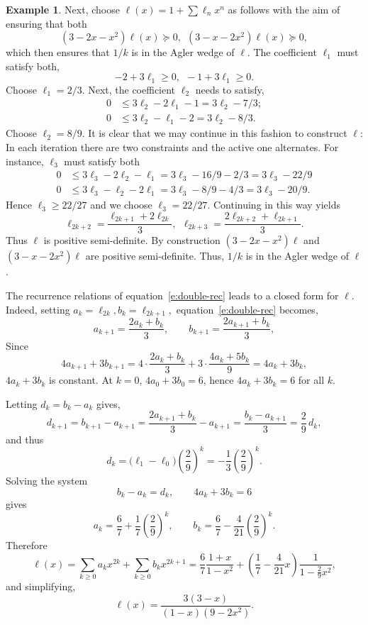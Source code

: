 \documentclass[a4paper,reqno,index]{amsart}
\numberwithin{equation}{section}
\theoremstyle{definition}
\newtheorem{example}[theorem]{Example}
\begin{document}
\begin{example}
 
Next, choose $\ell(x)= 1 +\sum \ell_n x^n$ as 
 follows with the aim of ensuring that both
\[
  (3-2x-x^2)\ell(x)\succeq 0, \  \ (3-x-2x^2)\ell(x) \succeq 0,
\]
 which then ensures that $1/k$ is in the Agler wedge of $\ell.$
The coefficient $\ell_1$ must satisfy both,
\[
 -2 + 3\ell_1 \ge0, \ \ -1 +3\ell_1 \ge0.
\]
Choose $\ell_1 = 2/3.$  Next, the coefficient $\ell_2$ needs to satisfy,
\[
\begin{split}
 0 & \le 3\ell_2 - 2\ell_1 -1 = 3\ell_2 - 7/3;
 \\ 0 & \le  3\ell_2 - \ell_1 - 2 =  3\ell_2 - 8/3.
\end{split}
\]
 Choose $\ell_2 = 8/9.$ It is clear that we may continue in this fashion
 to construct $\ell$:  In each iteration there are two constraints
 and the active one alternates.  For instance, 
 $\ell_3$ must satisfy both
\[
  \begin{split}
       0 & \le  3\ell_3-2\ell_2 -\ell_1 = 3\ell_3 - 16/9-2/3 = 3\ell_3- 22/9
    \\ 0 & \le  3\ell_3-\ell_2-2\ell_1 = 3\ell_3-8/9-4/3
     = 3\ell_3 - 20/9. 
  \end{split}
\]
 Hence $\ell_3\ge 22/27$ and we choose $\ell_3=22/27.$ Continuing in this way yields
 \begin{equation}
     \label{e:double-rec}
  \ell_{2k+2} = \frac{\ell_{2k+1} + 2\ell_{2k}}{3}, \ \ 
 \ell_{2k+3} = \frac{2\ell_{2k+2} + \ell_{2k+1}}{3}.
\end{equation}
 Thus $\ell$ is positive semi-definite.
 By construction $(3-2x-x^2)\ell$ and $(3-x-2x^2)\ell$ are positive semi-definite.
 Thus, $1/k$ is in the Agler wedge of $\ell$.  
 
 
 The recurrence relations of equation~\eqref{e:double-rec} leads to a closed form for $\ell.$ Indeed, setting $a_k=\ell_{2k}, b_k=\ell_{2k+1},$
  equation~\eqref{e:double-rec} becomes, 
\[
a_{k+1}=\frac{2a_k+b_k}{3},\qquad b_{k+1}=\frac{2a_{k+1}+b_k}{3},
\]
Since 
\[
4a_{k+1}+3b_{k+1}
=4\cdot\frac{2a_k+b_k}{3}+3\cdot\frac{4a_k+5b_k}{9}
=4a_k+3b_k,
\]
 $4a_k+3b_k$ is constant. At $k=0$,
$4a_0+3b_0=6$,
hence $4a_k+3b_k=6$ for all $k$.
 
Letting $d_k=b_k-a_k$ gives,
\[
d_{k+1}=b_{k+1}-a_{k+1}
=\frac{2a_{k+1}+b_k}{3}-a_{k+1}
=\frac{b_k-a_{k+1}}{3}
=\frac{2}{9}\,d_k,
\]
and thus
\[
d_k=\bigl(\ell_1-\ell_0\bigr)\left(\frac{2}{9}\right)^k
=-\frac{1}{3}\left(\frac{2}{9}\right)^k.
\]
 Solving the system
\[
b_k-a_k=d_k,\qquad 4a_k+3b_k=6
\]
gives
\begin{equation} \label{closedcoeff}
a_k=\frac{6}{7}+\frac{1}{7}\left(\frac{2}{9}\right)^k,\qquad
b_k=\frac{6}{7}-\frac{4}{21}\left(\frac{2}{9}\right)^k.    
\end{equation}
Therefore
\[
\ell(x)=\sum_{k\ge0}a_k x^{2k}+\sum_{k\ge0}b_k x^{2k+1}
=\frac{6}{7}\frac{1+x}{1-x^2}+\left(\frac{1}{7}-\frac{4}{21}x\right)\frac{1}{1-\frac{2}{9} x^2},
\]
and simplifying,
\begin{equation}\label{ellclosed}
\ell(x)=\frac{3(3-x)}{(1-x)(9-2x^2)}.
\end{equation}



\end{example}
\end{document}
